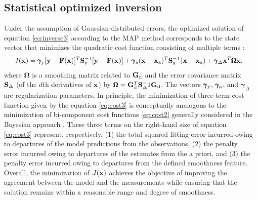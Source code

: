 \subsection{Statistical optimized inversion}

Under the assumption of Gaussian-distributed errors, the optimized
solution of equation \eqref{eq:inverse3} according to the 
MAP method corresponds to the state vector that minimizes the quadratic cost
function consisting of multiple terms \citep{Dubovik00a, Dubovik04}:
\begin{equation}
J(\mathbf{x}) = \pmb{\gamma}_\text{y}[\mathbf{y}-\mathbf{F}(\mathbf{x})]^T\mathbf{S}_\text{y}^{-1}[\mathbf{y}-\mathbf{F}(\mathbf{x})] +
          \pmb{\gamma}_\text{a}(\mathbf{x}-\mathbf{x}_\text{a})^T\mathbf{S}_\text{a}^{-1}(\mathbf{x}-\mathbf{x}_\text{a}) +
          \pmb{\gamma}_\Delta\mathbf{x}^T\pmb{\Omega}\mathbf{x}.
\label{eq:cost3}
\end{equation}
where $\pmb{\Omega}$ is a smoothing matrix related to $\mathbf{G}_\text{d}$ and the 
error covariance matrix $\mathbf{S}_\Delta$ (of the $d$th derivatives of
$\mathbf{x}$) by $\pmb{\Omega}=\mathbf{G}_\text{d}^T\mathbf{S}_\Delta^-1\mathbf{G}_\text{d}$. The
vectors $\pmb{\gamma}_\text{y}$, $\pmb{\gamma}_\text{a}$, and 
$\pmb{\gamma}_\Delta$ are regularization parameters. In principle,
the minimization of three-term cost function given by the equation
\eqref{eq:cost3} is conceptually analogous to the minimization of 
bi-component cost functions \eqref{eq:cost2} generally considered 
in the Bayesian approach \citep{Rodgers00}. These three terms on the 
right-hand size of equation \eqref{eq:cost3} represent,
respectively, (1) the total squared fitting error incurred owing to
departures of the model predictions from the observations, (2) the
penalty error incurred owing to departures of the estimates from the a
priori, and (3) the penalty error incurred owing to departures from the
defined smoothness feature. Overall, the minimization of $J(\mathbf{x})$ achieves
the objective of improving the agreement between the model and the
measurements while ensuring that the solution remains within a
reasonable range and degree of smoothness. 

